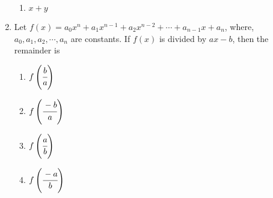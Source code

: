 \begin{multicols}{2}
\begin{enumerate}[label={\arabic*.}]
\begin{enumerate}[label={\Alph*.}]
	\item \(x+y\)
	\end{enumerate}
\item Let $f(x) = a_{0}x^{n} + a_{1}x^{n-1} + a_{2}x^{n-2} + \cdots + a_{n-1}x + a_{n}$, where, $a_{0}, a_{1}, a_{2}, \cdots, a_{n}$ are constants. If $f(x)$ is divided by $ax -b$, then the remainder is
	\begin{enumerate}[label={\Alph*.}]
	\item \(f\left(\cfrac{b}{a}\right)\)
	\item \(f\left(\cfrac{-b}{a}\right)\)
	\item \(f\left(\cfrac{a}{b}\right)\)
	\item \(f\left(\cfrac{-a}{b}\right)\)
	\end{enumerate}
\end{enumerate}
\end{multicols}